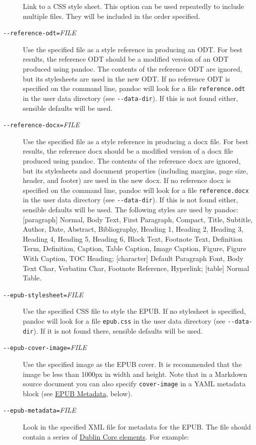 \documentclass[]{article}
\begin{document}
\begin{description}
Link to a CSS style sheet. This option can be used repeatedly to include
multiple files. They will be included in the order specified.
\item[\texttt{-\/-reference-odt=}\emph{FILE}]
Use the specified file as a style reference in producing an ODT. For
best results, the reference ODT should be a modified version of an ODT
produced using pandoc. The contents of the reference ODT are ignored,
but its stylesheets are used in the new ODT. If no reference ODT is
specified on the command line, pandoc will look for a file
\texttt{reference.odt} in the user data directory (see
\texttt{-\/-data-dir}). If this is not found either, sensible defaults
will be used.
\item[\texttt{-\/-reference-docx=}\emph{FILE}]
Use the specified file as a style reference in producing a docx file.
For best results, the reference docx should be a modified version of a
docx file produced using pandoc. The contents of the reference docx are
ignored, but its stylesheets and document properties (including margins,
page size, header, and footer) are used in the new docx. If no reference
docx is specified on the command line, pandoc will look for a file
\texttt{reference.docx} in the user data directory (see
\texttt{-\/-data-dir}). If this is not found either, sensible defaults
will be used. The following styles are used by pandoc: {[}paragraph{]}
Normal, Body Text, First Paragraph, Compact, Title, Subtitle, Author,
Date, Abstract, Bibliography, Heading 1, Heading 2, Heading 3, Heading
4, Heading 5, Heading 6, Block Text, Footnote Text, Definition Term,
Definition, Caption, Table Caption, Image Caption, Figure, Figure With
Caption, TOC Heading; {[}character{]} Default Paragraph Font, Body Text
Char, Verbatim Char, Footnote Reference, Hyperlink; {[}table{]} Normal
Table.
\item[\texttt{-\/-epub-stylesheet=}\emph{FILE}]
Use the specified CSS file to style the EPUB. If no stylesheet is
specified, pandoc will look for a file \texttt{epub.css} in the user
data directory (see \texttt{-\/-data-dir}). If it is not found there,
sensible defaults will be used.
\item[\texttt{-\/-epub-cover-image=}\emph{FILE}]
Use the specified image as the EPUB cover. It is recommended that the
image be less than 1000px in width and height. Note that in a Markdown
source document you can also specify \texttt{cover-image} in a YAML
metadata block (see \protect\hyperlink{epub-metadata}{EPUB Metadata},
below).
\item[\texttt{-\/-epub-metadata=}\emph{FILE}]
Look in the specified XML file for metadata for the EPUB. The file
should contain a series of
\href{http://dublincore.org/documents/dces/}{Dublin Core elements}. For
example:


\end{description}
\end{document}
